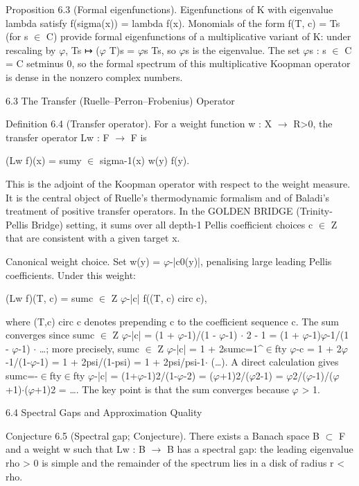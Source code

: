         Proposition 6.3 (Formal eigenfunctions). Eigenfunctions of K with eigenvalue
        lambda satisfy f(sigma(x)) = lambda f(x). Monomials of the form f(T, c) = Ts (for s
        $\in$ C) provide formal eigenfunctions of a multiplicative variant of K: under rescaling
        by $\varphi$, Ts ↦ ($\varphi$ T)s = $\varphi$s Ts, so $\varphi$s is the eigenvalue. The set {$\varphi$s : s $\in$ C} = C
        setminus {0}, so the formal spectrum of this multiplicative Koopman operator is
        dense in the nonzero complex numbers.

  6.3 The Transfer (Ruelle--Perron--Frobenius) Operator

        Definition 6.4 (Transfer operator). For a weight function w : X $\rightarrow$ R>0, the
        transfer operator Lw : F $\rightarrow$ F is

  (Lw f)(x) = sumy $\in$ sigma-1(x) w(y) f(y).

  This is the adjoint of the Koopman operator with respect to the weight measure. It is
  the central object of Ruelle's thermodynamic formalism and of Baladi's treatment of
  positive transfer operators. In the GOLDEN BRIDGE (Trinity-Pellis Bridge) setting, it sums over all depth-1 Pellis
  coefficient choices c $\in$ Z that are consistent with a given target x.

  Canonical weight choice. Set w(y) = $\varphi$-|c0(y)|, penalising large leading Pellis
  coefficients. Under this weight:

  (Lw f)(T, c) = sumc $\in$ Z $\varphi$-|c| f((T, c) circ c),

  where (T,c) circ c denotes prepending c to the coefficient sequence c. The sum
  converges since sumc $\in$ Z $\varphi$-|c| = (1 + $\varphi$-1)/(1 - $\varphi$-1) $\cdot$ 2 - 1 = (1 + $\varphi$-1)$\varphi$-1/(1 - $\varphi$-1) $\cdot$ …;
  more precisely, sumc $\in$ Z $\varphi$-|c| = 1 + 2sumc=1^$\in$fty $\varphi$-c = 1 + 2$\varphi$-1/(1-$\varphi$-1) = 1 +
  2psi/(1-psi) = 1 + 2psi/psi-1$\cdot$ (…). A direct calculation gives sumc=-$\in$fty$\in$fty $\varphi$-|c| =
  (1+$\varphi$-1)2/(1-$\varphi$-2) = ($\varphi$+1)2/($\varphi$2-1) = $\varphi$2/($\varphi$-1)/($\varphi$+1)$\cdot$($\varphi$+1)2 = …. The key point is that
  the sum converges because $\varphi$ > 1.

  6.4 Spectral Gaps and Approximation Quality

        Conjecture 6.5 (Spectral gap; Conjecture). There exists a Banach space B $\subset$ F
        and a weight w such that Lw : B $\rightarrow$ B has a spectral gap: the leading eigenvalue rho
        > 0 is simple and the remainder of the spectrum lies in a disk of radius r < rho.


